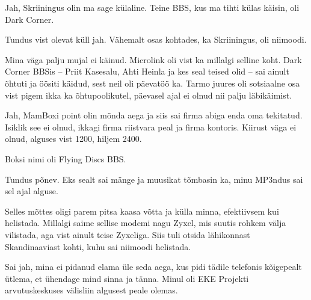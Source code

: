 Jah, Skriiningus olin ma sage külaline. Teine BBS, kus ma tihti 
külas käisin, oli Dark Corner.


Tundus vist olevat küll jah. Vähemalt osas kohtades, ka Skriiningus, oli 
niimoodi.


Mina väga palju mujal ei käinud. Microlink oli vist ka millalgi selline koht. 
Dark Corner BBSis -- Priit Kasesalu, Ahti 
Heinla ja kes seal teised olid -- sai 
ainult õhtuti ja öösiti käidud, sest neil oli päevatöö ka.
Tarmo juures oli sotsiaalne osa vist pigem ikka ka
õhtupoolikutel, päevasel ajal ei olnud nii palju 
läbikäimist.


Jah, MamBoxi point olin mõnda aega ja siis sai 
firma abiga enda oma tekitatud. Isiklik see ei olnud, ikkagi firma 
riistvara peal ja firma kontoris. Kiirust väga ei olnud, alguses vist 
1200, hiljem 2400. 


Boksi nimi oli Flying Discs BBS. 


Tundus põnev. Eks sealt sai mänge ja muusikat tõmbasin ka, minu MP3ndus 
sai sel ajal alguse.


Selles mõttes oligi parem pitsa kaasa võtta ja külla minna, efektiivsem kui helistada. Millalgi saime sellise modemi nagu 
Zyxel, mis suutis rohkem välja vilistada, aga vist 
ainult teise Zyxeliga. Siis tuli otsida lähikonnast Skandinaaviast 
kohti, kuhu sai niimoodi helistada.


Sai jah, mina ei pidanud elama üle seda aega, kus pidi tädile 
telefonis kõigepealt ütlema, et ühendage mind sinna ja tänna. Minul oli EKE 
Projekti arvutuskeskuses välisliin algusest peale olemas. 

